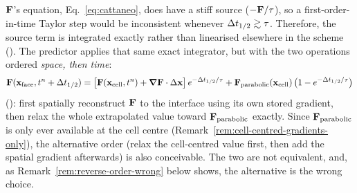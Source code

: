 $\mathbf{F}$'s equation, Eq.~\eqref{eq:cattaneo}, does have a stiff source
($-\mathbf{F}/\tau$), so a first-order-in-time Taylor step would be
inconsistent whenever $\Delta t_{1/2}\gtrsim\tau$. Therefore, the source term
is integrated exactly rather than linearised elsewhere in the scheme
(). The predictor
applies that same exact integrator, but with the two operations ordered
\emph{space, then time}:
\begin{equation}
  \label{eq:predictor-order}
  \mathbf{F}(\mathbf x_{\rm face},t^n+\Delta t_{1/2}) =
  \big[\mathbf{F}(\mathbf x_{\rm cell},t^n)+\grad\mathbf{F}\cdot\Delta\mathbf x\big]\,
  e^{-\Delta t_{1/2}/\tau} + \mathbf{F}_{\rm parabolic}(\mathbf x_{\rm cell})\,
  \big(1-e^{-\Delta t_{1/2}/\tau}\big)
\end{equation}
(): first spatially reconstruct
$\mathbf{F}$ to the interface using its own stored gradient, then relax the
whole extrapolated value toward $\mathbf{F}_{\rm parabolic}$ exactly. Since $\mathbf{F}_{\rm parabolic}$
is only ever available at the cell centre
(Remark~\ref{rem:cell-centred-gradients-only}), the alternative order
(relax the cell-centred value first, then add the spatial gradient
afterwards) is also conceivable. The two are not equivalent, and, as
Remark~\ref{rem:reverse-order-wrong} below shows, the alternative is the
wrong choice.

